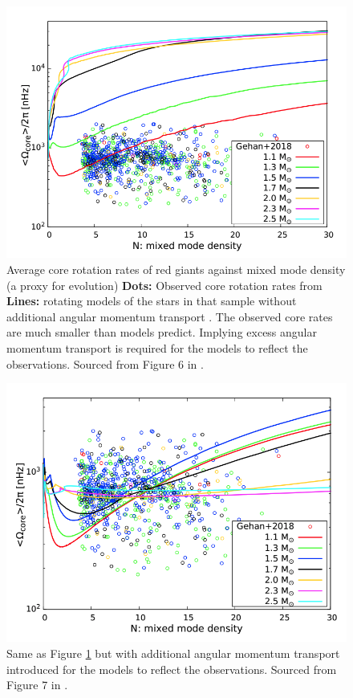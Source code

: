 \begin{figure}[h]
    \includegraphics[width=\textwidth]{Figures/intro_figures/rgb_core_rot_without.png}
    \caption{Average core rotation rates of red giants against mixed mode density (a proxy for evolution) 
    \textbf{Dots:} Observed core rotation rates from \citet{gehan_core_2018}
    \textbf{Lines:} rotating models of the stars in that sample without additional angular momentum transport \citep{moyano_asteroseismology_2022}.
    The observed core rates are much smaller than models predict. Implying excess angular momentum transport is required for the models to reflect the observations.
    Sourced from Figure 6 in \citep{moyano_asteroseismology_2022}.}
    \label{fig:rgb_cores_without}
\end{figure}

\begin{figure}[h]
    \includegraphics[width=\textwidth]{Figures/intro_figures/rgb_core_rot.png}
    \caption{Same as Figure \ref{fig:rgb_cores_without} but with additional angular momentum transport introduced for the models to reflect the observations.
    Sourced from Figure 7 in \citep{moyano_asteroseismology_2022}.}
    \label{fig:rgb_cores_with}
\end{figure}


